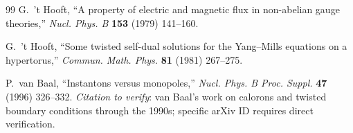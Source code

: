 \documentclass[11pt,a4paper]{amsart}
\theoremstyle{definition}
\begin{document}
\begin{thebibliography}{99}
G.~'t Hooft,
``A property of electric and magnetic flux in non-abelian gauge theories,''
\emph{Nucl. Phys. B} \textbf{153} (1979) 141--160.

G.~'t Hooft,
``Some twisted self-dual solutions for the Yang--Mills equations on a
hypertorus,''
\emph{Commun. Math. Phys.} \textbf{81} (1981) 267--275.

P.~van Baal,
``Instantons versus monopoles,''
\emph{Nucl. Phys. B Proc. Suppl.} \textbf{47} (1996) 326--332.
\emph{Citation to verify}: van Baal's work on calorons and twisted
boundary conditions through the 1990s; specific arXiv ID requires
direct verification.

\end{thebibliography}
\end{document}

